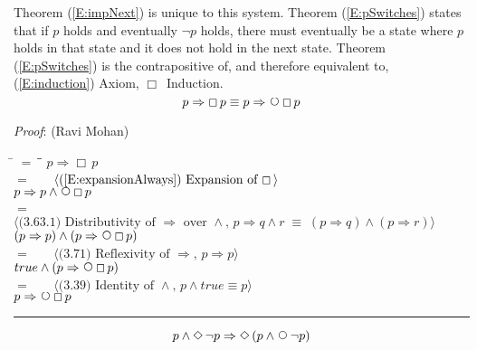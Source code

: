 \documentclass[12pt, fleqn, leqno]{article}
\newcommand{\lgap}{2pt}                             %
\newcommand{\mymathindent}{24pt}                    %
\newcommand{\equivs}{\ensuremath{\;\equiv\;}}       %
\newcommand{\impl}{\ensuremath{\Rightarrow}}        %
\newcommand{\Next}{\;\,\text{\raisebox{3.5pt}{\circle{6}}}}
\newcommand{\Event}{\Diamond\,}
\newcommand{\Always}{\Box\,}
\newcommand{\myqed}{\rule[-.23ex]{1.2ex}{2.0ex}}
\newcommand{\myqedtab}{\hspace{384pt}}              %
\newcommand{\Gll} {\langle}                         %
\newcommand{\Ggg} {\rangle}                         %
\newcommand{\Hint}[1]     {\ \ \ $\Gll              \mbox{#1} \Ggg$ }   %
\begin{document}
Theorem (\ref{E:impNext}) is unique to this system.
Theorem (\ref{E:pSwitches}) states that if $p$ holds and eventually $\neg p$ holds, there must eventually be a state where $p$ holds in that state and it does not hold in the next state.
Theorem (\ref{E:pSwitches}) is the contrapositive of, and therefore equivalent to, (\ref{E:induction}) Axiom, $\Always$ Induction.
\begin{equation}\label{E:impNext}
p \impl \Always p \equiv p \impl \Next\Always p
\end{equation}

\emph{Proof}: (Ravi Mohan)
\begin{tabbing}
\hspace{\mymathindent} \= $= \;$ \= \myqedtab \= \kill
  \> \>   $p\impl \Always p$\\[\lgap]
  \> $=$  \>  \Hint{(\ref{E:expansionAlways}) Expansion of $\Always$}\\[\lgap]
  \> \>   $p\impl p\land \Next\Always p$\\[\lgap]
  \> $=$  \>  \Hint{(3.63.1) Distributivity of $\impl$ over $\land$, $p\impl q\land r\equivs (p\impl q)\land (p\impl r)$}\\[\lgap]
  \> \>   $(p\impl p)\land (p\impl\Next\Always p)$\\[\lgap]
  \> $=$  \>  \Hint{(3.71) Reflexivity of $\impl$, $p\impl p$}\\[\lgap]
  \> \>   $true\land (p\impl\Next\Always p)$\\[\lgap]
  \> $=$  \>  \Hint{(3.39) Identity of $\land$, $p\land true\equiv p$}\\[\lgap]
  \> \>   $p \impl \Next\Always p$ \quad \myqed
\end{tabbing}
\begin{equation}\label{E:pSwitches}
p\land \Event\neg p \impl \Event(p\land\Next\neg p)
\end{equation}
\end{document}
